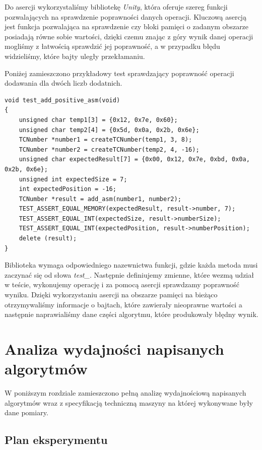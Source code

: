 \documentclass{article}
\begin{document}
Do asercji wykorzystaliśmy bibliotekę \textit{Unity}, która oferuje szereg funkcji pozwalających na sprawdzenie poprawności danych operacji. Kluczową asercją jest funkcja pozwalająca na sprawdzenie czy bloki pamięci o zadanym obszarze posiadają równe sobie wartości, dzięki czemu znając z góry wynik danej operacji mogliśmy z łatwością sprawdzić jej poprawność, a w przypadku błędu widzieliśmy, które bajty uległy przekłamaniu.

Poniżej zamieszczono przykładowy test sprawdzający poprawność operacji dodawania dla dwóch liczb dodatnich.

\begin{verbatim}
void test_add_positive_asm(void)
{
    unsigned char temp1[3] = {0x12, 0x7e, 0x60};
    unsigned char temp2[4] = {0x5d, 0x0a, 0x2b, 0x6e};
    TCNumber *number1 = createTCNumber(temp1, 3, 8);
    TCNumber *number2 = createTCNumber(temp2, 4, -16);
    unsigned char expectedResult[7] = {0x00, 0x12, 0x7e, 0xbd, 0x0a, 0x2b, 0x6e};
    unsigned int expectedSize = 7;
    int expectedPosition = -16;
    TCNumber *result = add_asm(number1, number2);
    TEST_ASSERT_EQUAL_MEMORY(expectedResult, result->number, 7);
    TEST_ASSERT_EQUAL_INT(expectedSize, result->numberSize);
    TEST_ASSERT_EQUAL_INT(expectedPosition, result->numberPosition);
    delete (result);
}
\end{verbatim}

Biblioteka wymaga odpowiedniego nazewnictwa funkcji, gdzie każda metoda musi zaczynać się od słowa \textit{test\_}. Następnie definiujemy zmienne, które wezmą udział w teście, wykonujemy operację i za pomocą asercji sprawdzamy poprawność wyniku. Dzięki wykorzystaniu asercji na obszarze pamięci na bieżąco otrzymywaliśmy informacje o bajtach, które zawierały nieoprawne wartości a następnie naprawialiśmy dane części algorytmu, które produkowały błędny wynik.

\section{Analiza wydajności napisanych algorytmów}

W poniższym rozdziale zamieszczono pełną analizę wydajnościową napisanych algorytmów wraz z specyfikacją techniczną maszyny na której wykonywane były dane pomiary.

\subsection{Plan eksperymentu}
\end{document}
